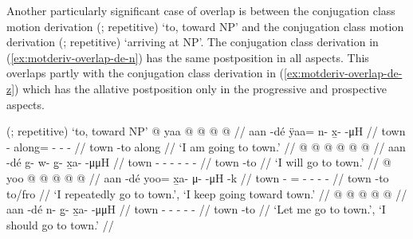 \documentclass[12pt,letterpaper,oneside,article]{memoir}
\begin{document}
Another particularly significant case of overlap is between the  conjugation class motion derivation  (;  repetitive) ‘to, toward NP’ and the  conjugation class motion derivation  (;  repetitive) ‘arriving at NP’.
The  conjugation class derivation in (\ref{ex:motderiv-overlap-de-n}) has the same postposition in all aspects.
This overlaps partly with the  conjugation class derivation in (\ref{ex:motderiv-overlap-de-z}) which has the allative postposition  only in the progressive and prospective aspects.

\pex\label{ex:motderiv-overlap-de-n}%
\a\label{ex:motderiv-overlap-de-n-motderiv}%
%
	 (;  repetitive) ‘to, toward NP’
\a\label{ex:motderiv-overlap-de-n-prog}%
%
\begingl
	\gla	{} @ {} yaa @  @ {} @ {} @ {} //
	\glb	aan -dé ÿaa= n- x̱-  -μH //
	\glc	town - along= - -  - //
	\gld	town -to along\•  {} {} {} //
	\glft	‘I am going to town.’
		//
\endgl
\a\label{ex:motderiv-overlap-de-n-prosp}%
%
\begingl
	\gla	{} @ {}  @ {} @ {} @ {} @ {} @ {} //
	\glb	aan -dé g- w- g̱- x̱a-  -μμH //
	\glc	town - - - - -  - //
	\gld	town -to  {} {} {} {} {} //
	\glft	‘I will go to town.’
		//
\endgl
\a\label{ex:motderiv-overlap-de-n-repimpfv}%
%
\begingl
	\gla	{} @ {} yoo @  @ {} @ {} @ {} @ {} //
	\glb	aan -dé yoo= x̱a- μ-  -μH -k //
	\glc	town - = - -  - - //
	\gld	town -to to/fro\·  {} {} {} {} //
	\glft	‘I repeatedly go to town.’, ‘I keep going toward town.’
		//
\endgl
\a\label{ex:motderiv-overlap-de-n-hort}%
%
\begingl
	\gla	{} @ {}  @ {} @ {} @ {} @ {} //
	\glb	aan -dé n- g̱- x̱a-  -μμH //
	\glc	town - - - -  - //
	\gld	town -to  {} {} {} {} //
	\glft	‘Let me go to town.’, ‘I should go to town.’
		//
\endgl
\xe
\end{document}
